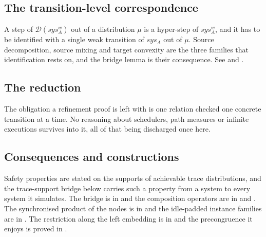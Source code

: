 \subsection{The transition-level correspondence}

A step of $\mathcal{D}(sys_A^w)$ out of a distribution $\mu$ is a hyper-step of $sys_A^w$, and it has to be identified with a single weak transition of $sys_A$ out of $\mu$.
Source decomposition, source mixing and target convexity are the three families that identification rests on, and the bridge lemma is their consequence.
See  and .






\subsection{The reduction}

The obligation a refinement proof is left with is one relation checked one concrete transition at a time.
No reasoning about schedulers, path measures or infinite executions survives into it, all of that being discharged once here.




\subsection{Consequences and constructions}

Safety properties are stated on the supports of achievable trace distributions, and the trace-support bridge below carries such a property from a system to every system it simulates.
The bridge is in  and the composition operators are in  and .
The synchronised product of the nodes is in  and the idle-padded instance families are in .
The restriction along the left embedding is in  and the precongruence it enjoys is proved in .














